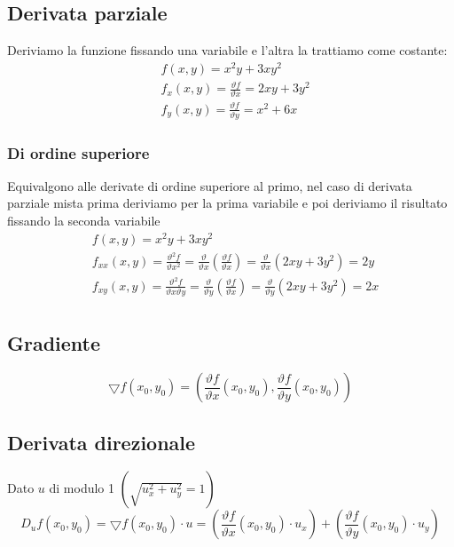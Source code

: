 \documentclass[10pt, a4paper]{article}
\begin{document}
    \subsection{Derivata parziale}
        Deriviamo la funzione fissando una variabile e l'altra la trattiamo come costante:
        \begin{equation*}
            \begin{split}
                &f(x,y)=x^2y+3xy^2 \\
                &f_x(x,y)=\frac{\vartheta f}{\vartheta x}=2xy+3y^2\\
                &f_y(x,y)=\frac{\vartheta f}{\vartheta y}=x^2+6x
            \end{split}
        \end{equation*}
    \subsubsection{Di ordine superiore}
        Equivalgono alle derivate di ordine superiore al primo, nel caso di derivata parziale mista prima deriviamo per la prima variabile e poi deriviamo il risultato fissando la seconda variabile
        \begin{equation*}
            \begin{split}
                &f(x,y)=x^2y+3xy^2 \\
                & f_{xx}(x,y)=\frac{\vartheta^2 f}{\vartheta x^2}=\frac{\vartheta}{\vartheta x}\left(\frac{\vartheta f}{\vartheta x}\right)=\frac{\vartheta}{\vartheta x}(2xy+3y^2)=2y\\
                & f_{xy}(x,y)=\frac{\vartheta^2 f}{\vartheta x\vartheta y}=\frac{\vartheta}{\vartheta y}\left(\frac{\vartheta f}{\vartheta x}\right)=\frac{\vartheta}{\vartheta y}(2xy+3y^2)=2x\\
            \end{split}
        \end{equation*}
    \subsection{Gradiente}
        \begin{equation*}
            \bigtriangledown f(x_0,y_0) = \left(\frac{\vartheta f}{\vartheta x}(x_0,y_0),\frac{\vartheta f}{\vartheta y}(x_0,y_0)\right)
        \end{equation*}
    \subsection{Derivata direzionale}
        Dato $u$ di modulo 1 $\left(\sqrt{u_x^2+u_y^2}=1\right)$
        \begin{equation*}
            D_uf(x_0,y_0)=\bigtriangledown f(x_0,y_0)\cdot u = \left(\frac{\vartheta f}{\vartheta x}(x_0,y_0)\cdot u_x\right) + \left(\frac{\vartheta f}{\vartheta y}(x_0,y_0)\cdot u_y\right)
        \end{equation*}
\end{document}
